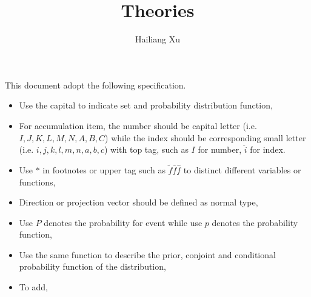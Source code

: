 \documentclass[runningheads,openany]{xhlPaper}
\begin{document}
\pagestyle{headings}
\mainmatter

\def\ACCV14SubNumber{***}  %

\title{Theories} %

\author{Hailiang Xu\\}
\maketitle


This document adopt the following specification.
\begin{itemize}
  \item Use the capital to indicate set and probability distribution function,
  \item For accumulation item, the number should be capital letter (i.e. $I, J, K, L, M, N, A, B, C$) while the index should be corresponding small letter (i.e. $i, j, k, l, m, n, a, b, c$) with top tag, such as $I$ for number, $\hat i$ for index.
  \item Use $*$ in footnotes or upper tag such as $\tilde f \bar f \hat f$ to distinct different variables or functions,
  \item Direction or projection vector should be defined as normal type, 
  \item Use $P$ denotes the probability for event while use $p$ denotes the probability function,
  \item Use the same function to describe the prior, conjoint and conditional probability function of the distribution,
  \item To add,
\end{itemize}
\end{document}
